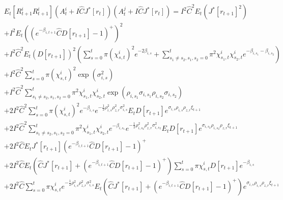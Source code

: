 \begin{align*}
&E_t[R_{t+1}^i  R_{t+1}^i] (A_t^i + I \hat C J^*[r_t])(A_t^j + I \hat C J^*[r_t])  =I^2 \hat C^2 E_t( J^*[r_{t+1}]^2) \\
&+I^2 E_t (( e^{- \beta_{i, t+1}} \hat C D[r_{t+1}] - 1)^+)^2  \\
&+ I^2 \hat C^2 E_t (D[r_{t+1}])^2  \left(\sum_{s = 0}^t \pi (\chi_{s, t}^i)^2e^{- 2\beta_{i, s} } + \sum_{s_1 \neq s_2, s_1, s_2 = 0}^t \pi^2 \chi_{s_1, t}^i   \chi_{s_2, t}^i  e^{- \beta_{i, s_1} - \beta_{i, s_2} } \right) \\
& + I^2 \hat C^2  \sum_{s = 0}^t \pi (\chi_{s, t}^i)^2 \exp(\sigma_{i, s}^2 ) \\
&+ I^2 \hat C^2  \sum_{s_1 \neq s_2, s_1, s_2 = 0}^t \pi^2 \chi_{s_1, t}^i \chi_{s_2, t}^i\exp(\rho_{i, s_1} \sigma_{i, s_1} \rho_{i, s_2} \sigma_{i, s_2}  ) \\
& + 2 I^2 \hat C^2 \sum_{s = 0}^t \pi (\chi_{s, t}^i)^2  e^{- \beta_{i, s}} e^{ - \frac{1}{2} \rho_{i, s}^2 \rho_{z,r}^2\sigma_{i, s}^2 }  E_t D[r_{t+1}] e^{ \sigma_{i, s} \rho_{i, s} \rho_{z,r} \xi_{t+1} } \\
&+ 2 I^2 \hat C^2 \sum_{s_1 \neq s_2, s_1, s_2 = 0}^t \pi^2 \chi_{s_1, t}^i \chi_{s_2, t}^i e^{- \beta_{i, s_1}} e^{ - \frac{1}{2} \rho_{i, s_2}^2 \rho_{z,r}^2 \sigma_{i, s_2}^2}E_t  D[r_{t+1}]  e^{ \sigma_{i, s_2} \rho_{i, s_2} \rho_{z,r} \xi_{t+1} }\\
&+2 I^2 \hat C  E_t J^*[r_{t+1}] ( e^{- \beta_{i, t+1}} \hat C D[r_{t+1}] - 1)^+  \\
&+ 2 I^2 \hat C E_t( \hat C J^*[r_{t+1}] + ( e^{- \beta_{i, t+1}} \hat C D[r_{t+1}] - 1)^+) \sum_{s = 0}^t \pi \chi_{s, t}^i  D[r_{t+1}] e^{- \beta_{i, s}} \\
&+ 2 I^2 \hat C \sum_{s = 0}^t \pi \chi_{s, t}^i    e^{ - \frac{1}{2}\rho_{i, s}^2 \rho_{z,r}^2 \sigma_{i, s}^2}  E_t( \hat C J^*[r_{t+1}] + ( e^{- \beta_{i, t+1}} \hat C D[r_{t+1}] - 1)^+)e^{ \sigma_{i, s} \rho_{i, s} \rho_{z,r} \xi_{t+1}  }
\end{align*}
